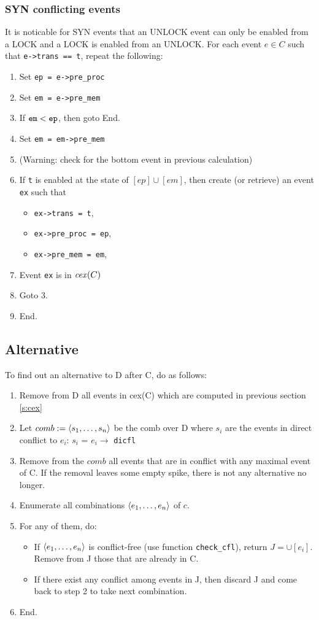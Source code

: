\documentclass{llncs}
\begin{document}
\subsubsection{SYN conflicting events}
\noindent
It is noticable for SYN events that an UNLOCK event can only be enabled from a LOCK and a LOCK is enabled from an UNLOCK.
For each event $e \in C$ such that \verb!e->trans == t!, repeat the following:
\begin{enumerate}
\item Set \verb!ep = e->pre_proc!
\item Set \verb!em = e->pre_mem!
\item If $\verb!em! < \verb!ep!$, then goto End.
\item Set \verb!em = em->pre_mem!
\item (Warning: check for the bottom event in previous calculation)
\item
  If \verb!t! is enabled at the state of $[ep] \cup [em]$, then create (or retrieve) an event \verb!ex! such that
  \begin{itemize}
  \item \verb!ex->trans = t!,
  \item \verb!ex->pre_proc = ep!,
  \item \verb!ex->pre_mem = em!,
  \end{itemize}
\item Event \verb!ex! is in $\mathop{\mathit{cex}} (C)$
\item Goto 3.
\item End.
\end{enumerate}

\subsection{Alternative}
\noindent
To find out an alternative to D after C, do as follows:
\begin{enumerate}
\item
	Remove from D all events in cex(C) which are computed in previous section \cref{s:cex}
\item
	Let $comb \mathrel{:=} \langle s_1, \ldots, s_n\rangle$ be the comb over D where 
	$s_i$ are the events in direct conflict to $e_i$: $s_i$ = $e_i \rightarrow$ \verb!dicfl!
\item
	Remove from the $comb$ all events that are in conflict with any maximal event of C. If the removal leaves some empty spike, 
	there is not any alternative no longer.
\item
	Enumerate all combinations $\langle e_1, \ldots, e_n\rangle$ of $c$.
\item
	For any of them, do:
	\begin{itemize}
		\item 
    		If $\langle e_1, \ldots, e_n\rangle$ is conflict-free (use function \verb!check_cfl!), return $J = \cup [e_i]$. Remove from J those that are already in C.
   		\item
			If there exist any conflict among events in J, then discard J and come back to step 2
			to take next combination.
	\end{itemize}
\item End.
\end{enumerate}
\end{document}
